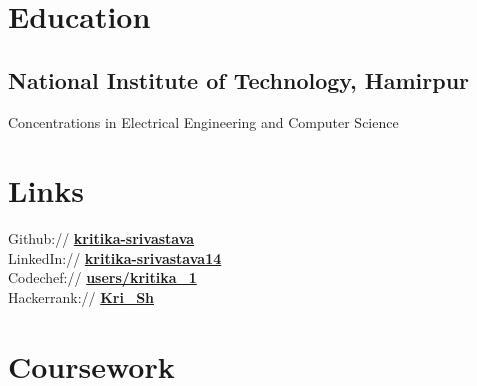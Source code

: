 \documentclass[a4paper]{deedy-resume} %
\begin{document}
\begin{minipage}[t]{0.30\textwidth} %


\section{Education} 

\subsection{National Institute of Technology, Hamirpur }


Concentrations in Electrical Engineering  and Computer Science\\


\sectionspace %


\section{Links} 

Github:// \href{https://github.com/kritika-srivastava}{\bf kritika-srivastava} \\
LinkedIn:// \href{https://www.linkedin.com/in/kritika-srivastava14}{\bf kritika-srivastava14} \\
Codechef:// \href{https://www.codechef.com/users/kritika_1}{\bf users/kritika\_1} \\
Hackerrank:// \href{https://www.hackerrank.com/Kri_Sh?hr_r=1}{\bf Kri\_Sh} 

\sectionspace %


\section{Coursework}


\end{minipage}
\end{document}
